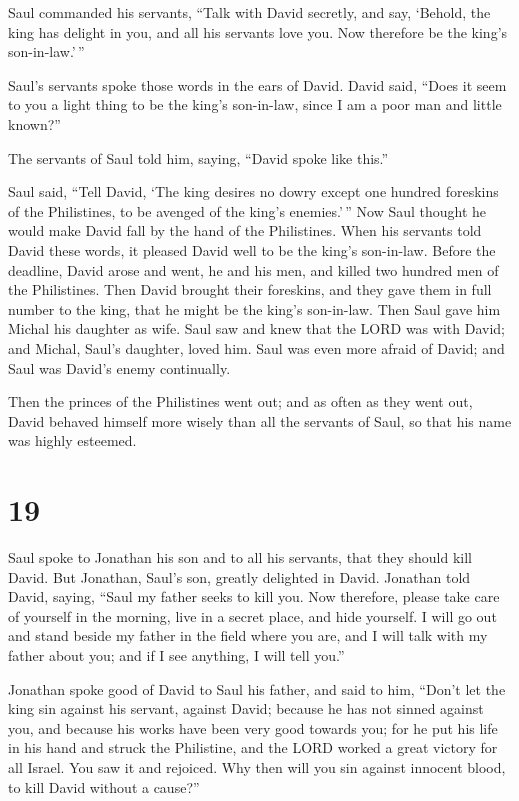  Saul commanded his servants, ``Talk with David secretly,
and say, `Behold, the king has delight in you, and all his servants love
you. Now therefore be the king's son-in-law.'\,''

 Saul's servants spoke those words in the ears of David.
David said, ``Does it seem to you a light thing to be the king's
son-in-law, since I am a poor man and little known?''

 The servants of Saul told him, saying, ``David spoke like
this.''

 Saul said, ``Tell David, `The king desires no dowry except
one hundred foreskins of the Philistines, to be avenged of the king's
enemies.'\,'' Now Saul thought he would make David fall by the hand of
the Philistines.  When his servants told David these words,
it pleased David well to be the king's son-in-law. Before the deadline,
 David arose and went, he and his men, and killed two
hundred men of the Philistines. Then David brought their foreskins, and
they gave them in full number to the king, that he might be the king's
son-in-law. Then Saul gave him Michal his daughter as wife.
 Saul saw and knew that the LORD was with David; and
Michal, Saul's daughter, loved him.  Saul was even more
afraid of David; and Saul was David's enemy continually.

 Then the princes of the Philistines went out; and as often
as they went out, David behaved himself more wisely than all the
servants of Saul, so that his name was highly esteemed.

\hypertarget{section-18}{%
\section{19}\label{section-18}}

 Saul spoke to Jonathan his son and to all his servants,
that they should kill David. But Jonathan, Saul's son, greatly delighted
in David.  Jonathan told David, saying, ``Saul my father
seeks to kill you. Now therefore, please take care of yourself in the
morning, live in a secret place, and hide yourself.  I will
go out and stand beside my father in the field where you are, and I will
talk with my father about you; and if I see anything, I will tell you.''

 Jonathan spoke good of David to Saul his father, and said
to him, ``Don't let the king sin against his servant, against David;
because he has not sinned against you, and because his works have been
very good towards you;  for he put his life in his hand and
struck the Philistine, and the LORD worked a great victory for all
Israel. You saw it and rejoiced. Why then will you sin against innocent
blood, to kill David without a cause?''

